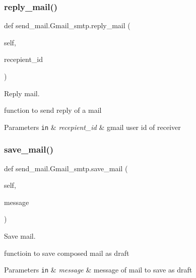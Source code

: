 \subsubsection{\texorpdfstring{reply\+\_\+mail()}{reply\_mail()}}
{\footnotesize\ttfamily def send\+\_\+mail.\+Gmail\+\_\+smtp.\+reply\+\_\+mail (\begin{DoxyParamCaption}\item[{}]{self,  }\item[{}]{recepient\+\_\+id }\end{DoxyParamCaption})}



Reply mail. 

function to send reply of a mail


\begin{DoxyParams}[1]{Parameters}
\mbox{\tt in}  & {\em recepient\+\_\+id} & gmail user id of receiver \\
\hline
\end{DoxyParams}
\mbox{\label{classsend__mail_1_1Gmail__smtp_ae3ca9a4080b5236ef5f3499e509fb3d0}} 
\subsubsection{\texorpdfstring{save\+\_\+mail()}{save\_mail()}}
{\footnotesize\ttfamily def send\+\_\+mail.\+Gmail\+\_\+smtp.\+save\+\_\+mail (\begin{DoxyParamCaption}\item[{}]{self,  }\item[{}]{message }\end{DoxyParamCaption})}



Save mail. 

functioin to save composed mail as draft


\begin{DoxyParams}[1]{Parameters}
\mbox{\tt in}  & {\em message} & message of mail to save as draft \\
\hline
\end{DoxyParams}
\mbox{\label{classsend__mail_1_1Gmail__smtp_ab7dbba6a289f09f2abc986f586d26bb8}} 
